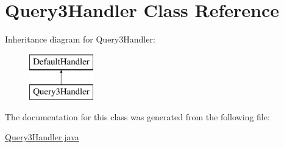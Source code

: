 \hypertarget{class_query3_handler}{}\section{Query3\+Handler Class Reference}
\label{class_query3_handler}
Inheritance diagram for Query3\+Handler\+:\begin{figure}[H]
\begin{center}
\leavevmode
\includegraphics[height=2.000000cm]{class_query3_handler}
\end{center}
\end{figure}


The documentation for this class was generated from the following file\+:\begin{DoxyCompactItemize}
\item 
\hyperlink{_query3_handler_8java}{Query3\+Handler.\+java}\end{DoxyCompactItemize}
